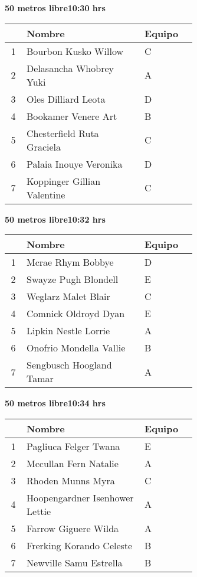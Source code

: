 \begin{minipage}{0.95\linewidth}
\begin{center}
\textbf{
50 metros libre\hspace{1cm}10:30 hrs}
\end{center}
\begin{tabular}{cp{0.63\linewidth}l}
\hline
& \textbf{Nombre} & \textbf{Equipo} \\ \hline
1 & Bourbon Kusko Willow & C \\ 
2 & Delasancha Whobrey Yuki & A \\ 
3 & Oles Dilliard Leota & D \\ 
4 & Bookamer Venere Art & B \\ 
5 & Chesterfield Ruta Graciela & C \\ 
6 & Palaia Inouye Veronika & D \\ 
7 & Koppinger Gillian Valentine & C \\ 
\end{tabular}
\end{minipage}
\begin{minipage}{0.95\linewidth}
\begin{center}
\textbf{
50 metros libre\hspace{1cm}10:32 hrs}
\end{center}
\begin{tabular}{cp{0.63\linewidth}l}
\hline
& \textbf{Nombre} & \textbf{Equipo} \\ \hline
1 & Mcrae Rhym Bobbye & D \\ 
2 & Swayze Pugh Blondell & E \\ 
3 & Weglarz Malet Blair & C \\ 
4 & Comnick Oldroyd Dyan & E \\ 
5 & Lipkin Nestle Lorrie & A \\ 
6 & Onofrio Mondella Vallie & B \\ 
7 & Sengbusch Hoogland Tamar & A \\ 
\end{tabular}
\end{minipage}
\begin{minipage}{0.95\linewidth}
\begin{center}
\textbf{
50 metros libre\hspace{1cm}10:34 hrs}
\end{center}
\begin{tabular}{cp{0.63\linewidth}l}
\hline
& \textbf{Nombre} & \textbf{Equipo} \\ \hline
1 & Pagliuca Felger Twana & E \\ 
2 & Mccullan Fern Natalie & A \\ 
3 & Rhoden Munns Myra & C \\ 
4 & Hoopengardner Isenhower Lettie & A \\ 
5 & Farrow Giguere Wilda & A \\ 
6 & Frerking Korando Celeste & B \\ 
7 & Newville Samu Estrella & B \\ 
\end{tabular}
\end{minipage}
